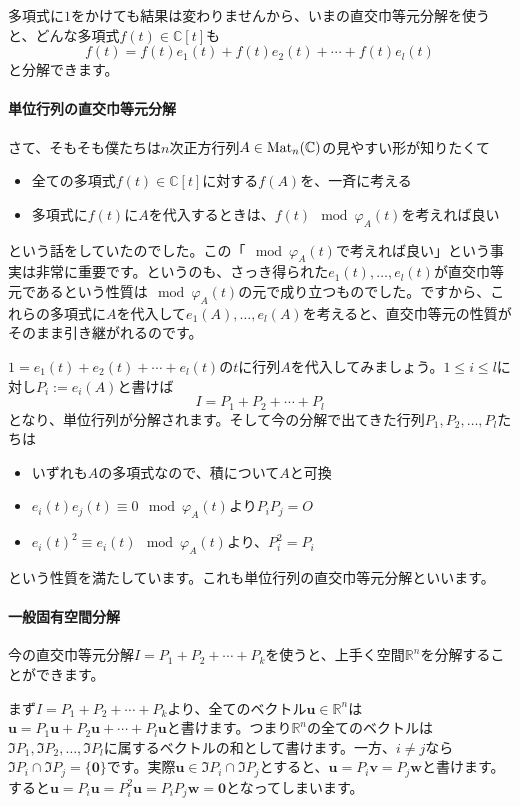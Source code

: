 多項式に$1$をかけても結果は変わりませんから、いまの直交巾等元分解を使うと、どんな多項式$f(t) \in \mathbb{C}[t]$も
\[
f(t) = f(t) e_1(t) + f(t) e_2(t) + \cdots + f(t) e_l(t)
\]
と分解できます。

\paragraph{単位行列の直交巾等元分解}

さて、そもそも僕たちは$n$次正方行列$A \in \operatorname{Mat}_n(\mathbb{C})$の見やすい形が知りたくて
\begin{itemize}
\item 全ての多項式$f(t) \in \mathbb{C}[t]$に対する$f(A)$を、一斉に考える
\item 多項式に$f(t)$に$A$を代入するときは、$f(t) \mod \varphi_A(t)$を考えれば良い
\end{itemize}
という話をしていたのでした。この「$\!\!\!\mod \varphi_A(t)$で考えれば良い」という事実は非常に重要です。というのも、さっき得られた$e_1(t), \ldots, e_l(t)$が直交巾等元であるという性質は$\!\!\!\mod \varphi_A(t)$の元で成り立つものでした。ですから、これらの多項式に$A$を代入して$e_1(A), \ldots, e_l(A)$を考えると、直交巾等元の性質がそのまま引き継がれるのです。

$1 = e_1(t) + e_2(t) + \cdots + e_l(t)$の$t$に行列$A$を代入してみましょう。$1 \leq i \leq l$に対し$P_i := e_i(A)$と書けば
\[
I = P_1 + P_2 + \cdots + P_l
\]
となり、単位行列が分解されます。そして今の分解で出てきた行列$P_1, P_2, \ldots, P_l$たちは
\begin{itemize}
\item いずれも$A$の多項式なので、積について$A$と可換
\item $e_i(t) e_j(t) \equiv 0 \mod \varphi_A(t)$より$P_i P_j = O$
\item $e_i(t)^2 \equiv e_i(t) \mod \varphi_A(t)$より、$P_i^2 = P_i$
\end{itemize}
という性質を満たしています。これも単位行列の直交巾等元分解といいます。

\paragraph{一般固有空間分解}

今の直交巾等元分解$I = P_1 + P_2 + \cdots + P_k$を使うと、上手く空間$\mathbb{R}^n$を分解することができます。

まず$I = P_1 + P_2 + \cdots + P_k$より、全てのベクトル$\bm{u} \in \mathbb{R}^n$は$\bm{u} = P_1\bm{u} + P_2\bm{u} + \cdots + P_l\bm{u}$と書けます。つまり$\mathbb{R}^n$の全てのベクトルは$\Im P_1, \Im P_2, \ldots, \Im P_l$に属するベクトルの和として書けます。一方、$i \neq j$なら$\Im P_i \cap \Im P_j = \{\bm{0}\}$です。実際$\bm{u} \in \Im P_i \cap \Im P_j$とすると、$\bm{u} = P_i \bm{v} = P_j \bm{w}$と書けます。すると$\bm{u} = P_i \bm{u} = P_i^2 \bm{u} = P_i P_j \bm{w} = \bm{0}$となってしまいます。

